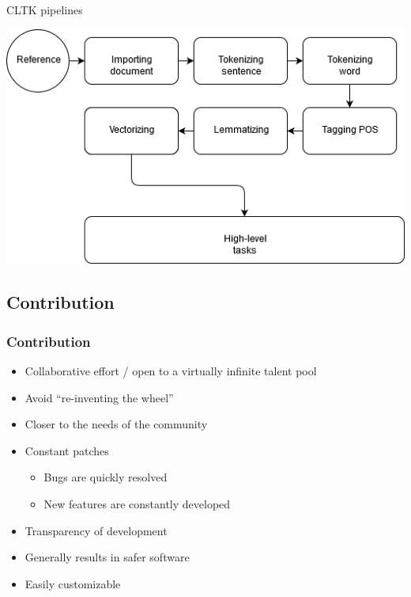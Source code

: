 \documentclass{beamer}
\begin{document}
\begin{frame}{CLTK pipelines}
\begin{center}
    \includegraphics[scale=0.5]{cltk_pipelines-cltk_pipelines_executing.png}
    \end{center}
\end{frame}








\subsection{Contribution}

\begin{frame}
\frametitle{Contribution}
\begin{itemize}
    \item Collaborative effort / open to a virtually infinite talent pool
    \item Avoid “re-inventing the wheel”
    \item Closer to the needs of the community
    \item Constant patches 
    \begin{itemize}
    \item Bugs are quickly resolved 
    \item New features are constantly developed
    
    \end{itemize}
    \item Transparency of development
    \item Generally results in safer software
    \item Easily customizable
\end{itemize}
\end{frame}
\end{document}
